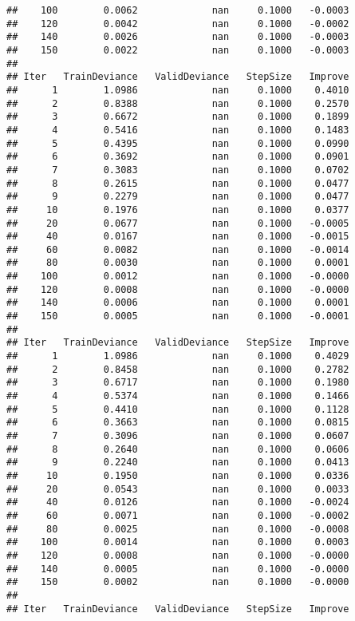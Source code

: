 \documentclass[
]{article}
\begin{document}
\begin{verbatim}
##    100        0.0062             nan     0.1000   -0.0003
##    120        0.0042             nan     0.1000   -0.0002
##    140        0.0026             nan     0.1000   -0.0003
##    150        0.0022             nan     0.1000   -0.0003
## 
## Iter   TrainDeviance   ValidDeviance   StepSize   Improve
##      1        1.0986             nan     0.1000    0.4010
##      2        0.8388             nan     0.1000    0.2570
##      3        0.6672             nan     0.1000    0.1899
##      4        0.5416             nan     0.1000    0.1483
##      5        0.4395             nan     0.1000    0.0990
##      6        0.3692             nan     0.1000    0.0901
##      7        0.3083             nan     0.1000    0.0702
##      8        0.2615             nan     0.1000    0.0477
##      9        0.2279             nan     0.1000    0.0477
##     10        0.1976             nan     0.1000    0.0377
##     20        0.0677             nan     0.1000   -0.0005
##     40        0.0167             nan     0.1000   -0.0015
##     60        0.0082             nan     0.1000   -0.0014
##     80        0.0030             nan     0.1000    0.0001
##    100        0.0012             nan     0.1000   -0.0000
##    120        0.0008             nan     0.1000   -0.0000
##    140        0.0006             nan     0.1000    0.0001
##    150        0.0005             nan     0.1000   -0.0001
## 
## Iter   TrainDeviance   ValidDeviance   StepSize   Improve
##      1        1.0986             nan     0.1000    0.4029
##      2        0.8458             nan     0.1000    0.2782
##      3        0.6717             nan     0.1000    0.1980
##      4        0.5374             nan     0.1000    0.1466
##      5        0.4410             nan     0.1000    0.1128
##      6        0.3663             nan     0.1000    0.0815
##      7        0.3096             nan     0.1000    0.0607
##      8        0.2640             nan     0.1000    0.0606
##      9        0.2240             nan     0.1000    0.0413
##     10        0.1950             nan     0.1000    0.0336
##     20        0.0543             nan     0.1000    0.0033
##     40        0.0126             nan     0.1000   -0.0024
##     60        0.0071             nan     0.1000   -0.0002
##     80        0.0025             nan     0.1000   -0.0008
##    100        0.0014             nan     0.1000    0.0003
##    120        0.0008             nan     0.1000   -0.0000
##    140        0.0005             nan     0.1000   -0.0000
##    150        0.0002             nan     0.1000   -0.0000
## 
## Iter   TrainDeviance   ValidDeviance   StepSize   Improve

\end{verbatim}
\end{document}
